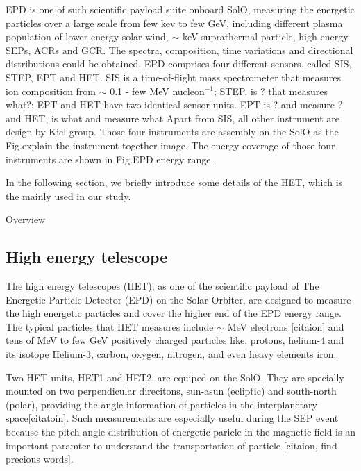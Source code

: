 \ac{EPD} \citet{RodriguezPacheco-2019-EPD} is one of such scientific payload suite onboard \ac{SolO}, measuring the energetic particles over a large scale from few kev to few GeV, including different plasma population of lower energy solar wind,  $\sim$ keV suprathermal particle, high energy \acp{SEP}, \acp{ACR} and \ac{GCR}. The spectra, composition, time variations and directional distributions could be obtained.
\ac{EPD} comprises four different sensors, called \ac{SIS}, \ac{STEP}, \ac{EPT} and \ac{HET}. 
\ac{SIS} is a time-of-flight mass spectrometer that measures ion composition from $\sim$ 0.1 - few MeV nucleon$^{-1}$;
 \ac{STEP}, is ? that measures what?;  
\ac{EPT} and \ac{HET} have two identical sensor units.
\ac{EPT} is ? and measure ? and \ac{HET}, is what and measure what
Apart from SIS, all other instrument are design by Kiel group.
Those four instruments are assembly on the SolO as the Fig.{}explain the instrument together image. The energy coverage of those four instruments are shown in Fig.{EPD energy range}.

In the following section, we briefly introduce some details of the \ac{HET}, which is the mainly used in our study.

Overview
\subsection{High energy telescope}

\citep{Elftmann-2020-PhD}

The high energy telescopes (HET), as one of the scientific payload of The Energetic Particle Detector (EPD) \cite{EPD_instrument} on the Solar Orbiter, are designed to measure the high energetic particles and cover the higher end of the EPD energy range. The typical particles that HET measures include $\sim$ MeV electrons [citaion] and tens of MeV to few GeV positively charged particles like, protons, helium-4 and its isotope Helium-3, carbon, oxygen, nitrogen, and even heavy elements iron. 

Two HET units, HET1 and HET2, are equiped on the \ac{SolO}. They are specially mounted on two perpendicular direcitons, sun-asun (ecliptic) and south-north (polar), providing the angle information of particles in the interplanetary space[citatoin]. Such measurements are especially useful during the SEP event because the pitch angle  distribution of energetic paricle in the magnetic field is an important paramter to understand the transportation of particle [citaion, find precious words]. 

